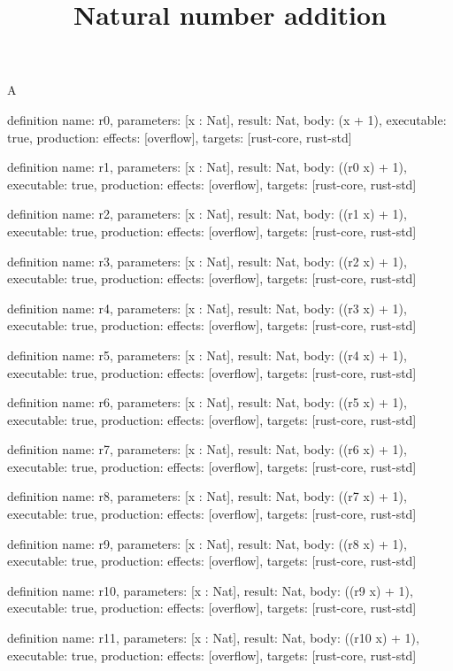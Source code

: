 \begin{lexlean}{A}
\title{Natural number addition}
\begin{semanticmodule}
definition{
  name: r0,
  parameters: [x : Nat],
  result: Nat,
  body: (x + 1),
  executable: true,
  production: {effects: [overflow], targets: [rust-core, rust-std]}
}

definition{
  name: r1,
  parameters: [x : Nat],
  result: Nat,
  body: ((r0 x) + 1),
  executable: true,
  production: {effects: [overflow], targets: [rust-core, rust-std]}
}

definition{
  name: r2,
  parameters: [x : Nat],
  result: Nat,
  body: ((r1 x) + 1),
  executable: true,
  production: {effects: [overflow], targets: [rust-core, rust-std]}
}

definition{
  name: r3,
  parameters: [x : Nat],
  result: Nat,
  body: ((r2 x) + 1),
  executable: true,
  production: {effects: [overflow], targets: [rust-core, rust-std]}
}

definition{
  name: r4,
  parameters: [x : Nat],
  result: Nat,
  body: ((r3 x) + 1),
  executable: true,
  production: {effects: [overflow], targets: [rust-core, rust-std]}
}

definition{
  name: r5,
  parameters: [x : Nat],
  result: Nat,
  body: ((r4 x) + 1),
  executable: true,
  production: {effects: [overflow], targets: [rust-core, rust-std]}
}

definition{
  name: r6,
  parameters: [x : Nat],
  result: Nat,
  body: ((r5 x) + 1),
  executable: true,
  production: {effects: [overflow], targets: [rust-core, rust-std]}
}

definition{
  name: r7,
  parameters: [x : Nat],
  result: Nat,
  body: ((r6 x) + 1),
  executable: true,
  production: {effects: [overflow], targets: [rust-core, rust-std]}
}

definition{
  name: r8,
  parameters: [x : Nat],
  result: Nat,
  body: ((r7 x) + 1),
  executable: true,
  production: {effects: [overflow], targets: [rust-core, rust-std]}
}

definition{
  name: r9,
  parameters: [x : Nat],
  result: Nat,
  body: ((r8 x) + 1),
  executable: true,
  production: {effects: [overflow], targets: [rust-core, rust-std]}
}

definition{
  name: r10,
  parameters: [x : Nat],
  result: Nat,
  body: ((r9 x) + 1),
  executable: true,
  production: {effects: [overflow], targets: [rust-core, rust-std]}
}

definition{
  name: r11,
  parameters: [x : Nat],
  result: Nat,
  body: ((r10 x) + 1),
  executable: true,
  production: {effects: [overflow], targets: [rust-core, rust-std]}
}


\end{semanticmodule}
\end{lexlean}

